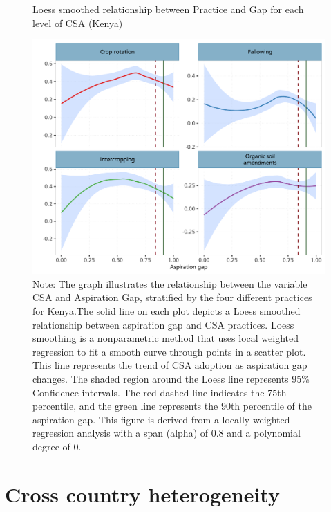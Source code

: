 \documentclass[
]{article}
\begin{document}
\begin{figure}[htbp]
\centering
\caption{Loess smoothed relationship between Practice and Gap for each level of CSA (Kenya)}
\includegraphics[width=\textwidth]{figures/fig_NP_ken.pdf}

\caption*{
Note: The graph illustrates the relationship between the variable CSA and Aspiration Gap, stratified by the four different practices for Kenya.The solid line on each plot depicts a Loess smoothed relationship between aspiration gap and CSA practices. Loess smoothing is a nonparametric method that uses local weighted regression to fit a smooth curve through points in a scatter plot. This line represents the trend of CSA adoption as aspiration gap changes. The shaded region around the Loess line represents 95\% Confidence intervals. The red dashed line indicates the 75th percentile, and the green line represents the 90th percentile of the aspiration gap. This figure is derived from a locally weighted regression analysis with a span (alpha) of 0.8 and a polynomial degree of 0. 
}
\end{figure}
\newpage

\hypertarget{cross-country-heterogeneity}{%
\section{Cross country heterogeneity}\label{cross-country-heterogeneity}}
\end{document}
